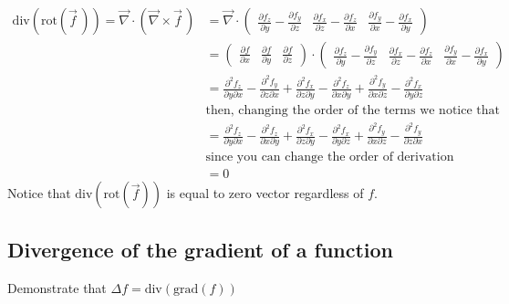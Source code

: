  \begin{align*}
  \text{div}(\text{rot}(\vec f \,)) = \vec\nabla \cdot \left(\vec\nabla \times \vec f\,\right) 
    & = 
      \vec\nabla \cdot
      \begin{pmatrix} 
        \frac{\partial f_z}{\partial y} - \frac{\partial f_y}{\partial z} &
        \frac{\partial f_x}{\partial z} - \frac{\partial f_z}{\partial x} &
        \frac{\partial f_y}{\partial x} - \frac{\partial f_x}{\partial y} 
      \end{pmatrix} \\
    & = 
      \begin{pmatrix}
        \frac{\partial f}{\partial x} &
        \frac{\partial f}{\partial y} &
        \frac{\partial f}{\partial z}
      \end{pmatrix}
      \cdot
      \begin{pmatrix} 
        \frac{\partial f_z}{\partial y} - \frac{\partial f_y}{\partial z} &
        \frac{\partial f_x}{\partial z} - \frac{\partial f_z}{\partial x} &
        \frac{\partial f_y}{\partial x} - \frac{\partial f_x}{\partial y} 
      \end{pmatrix} \\
    & = 
      \frac{\partial^2 f_z}{\partial y \partial x} - \frac{\partial^2 f_y}{\partial z \partial x} +
      \frac{\partial^2 f_x}{\partial z \partial y} - \frac{\partial^2 f_z}{\partial x \partial y} +
      \frac{\partial^2 f_y}{\partial x \partial z} - \frac{\partial^2 f_x}{\partial y \partial z} \\
    & \text{then, changing the order of the terms we notice that} \\
    & =
      \frac{\partial^2 f_z}{\partial y \partial x} - \frac{\partial^2 f_z}{\partial x \partial y} +
      \frac{\partial^2 f_x}{\partial z \partial y} - \frac{\partial^2 f_x}{\partial y \partial z} +
      \frac{\partial^2 f_y}{\partial x \partial z} - \frac{\partial^2 f_y}{\partial z \partial x} \\
    & \text{since you can change the order of derivation} \\
    & = 0
  \end{align*}
  Notice that $\text{div}(\text{rot}(\vec f))$ is equal to zero vector regardless of $f$.

  \subsection{Divergence of the gradient of a function}
  Demonstrate that $\Delta f = \text{div}(\text{grad}(f))$
  
